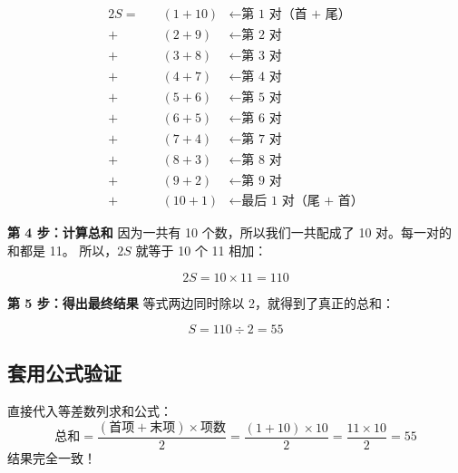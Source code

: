 \documentclass[DIN, pagenumber=false, fontsize=11pt, parskip=half]{scrartcl}
\begin{document}
\[
\begin{aligned}
2S = \quad & (1 + 10) & \leftarrow \text{第 1 对（首 + 尾）} \\
        + \quad & (2 + 9)  & \leftarrow \text{第 2 对} \\
        + \quad & (3 + 8)  & \leftarrow \text{第 3 对} \\
        + \quad & (4 + 7)  & \leftarrow \text{第 4 对} \\
        + \quad & (5 + 6)  & \leftarrow \text{第 5 对} \\
        + \quad & (6 + 5)  & \leftarrow \text{第 6 对} \\
        + \quad & (7 + 4)  & \leftarrow \text{第 7 对} \\
        + \quad & (8 + 3)  & \leftarrow \text{第 8 对} \\
        + \quad & (9 + 2)  & \leftarrow \text{第 9 对} \\
        + \quad & (10 + 1) & \leftarrow \text{最后 1 对（尾 + 首）}
\end{aligned}
\]

\textbf{第 4 步：计算总和}
因为一共有 10 个数，所以我们一共配成了 10 对。每一对的和都是 11。
所以，$2S$ 就等于 10 个 11 相加：

\[
2S = 10 \times 11 = 110
\]

\textbf{第 5 步：得出最终结果}
等式两边同时除以 2，就得到了真正的总和：

\[
S = 110 \div 2 = 55
\]

\subsection*{套用公式验证}
直接代入等差数列求和公式：
\[
\text{总和} = \frac{(\text{首项} + \text{末项}) \times \text{项数}}{2} = \frac{(1 + 10) \times 10}{2} = \frac{11 \times 10}{2} = 55
\]
结果完全一致！
\end{document}
